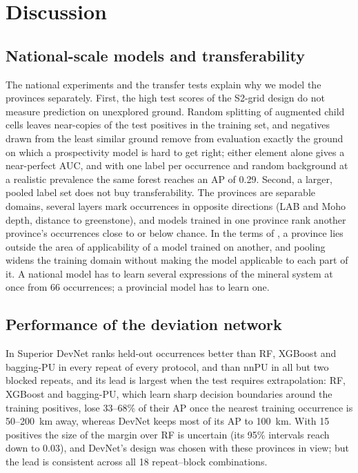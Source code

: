 \documentclass[pdflatex,sn-apa]{sn-jnl}
\begin{document}
\section{Discussion}\label{sec:discussion}

\subsection{National-scale models and transferability}\label{sec:disc-scale}

The national experiments and the transfer tests explain why we model the provinces separately. First, the high test scores of the S2-grid design do not measure prediction on unexplored ground. Random splitting of augmented child cells leaves near-copies of the test positives in the training set, and negatives drawn from the least similar ground remove from evaluation exactly the ground on which a prospectivity model is hard to get right; either element alone gives a near-perfect AUC, and with one label per occurrence and random background at a realistic prevalence the same forest reaches an AP of 0.29. Second, a larger, pooled label set does not buy transferability. The provinces are separable domains, several layers mark occurrences in opposite directions (LAB and Moho depth, distance to greenstone), and models trained in one province rank another province's occurrences close to or below chance. In the terms of \citet{Meyer2021}, a province lies outside the area of applicability of a model trained on another, and pooling widens the training domain without making the model applicable to each part of it. A national model has to learn several expressions of the mineral system at once from 66 occurrences; a provincial model has to learn one.

\subsection{Performance of the deviation network}\label{sec:disc-devnet}

In Superior DevNet ranks held-out occurrences better than RF, XGBoost and bagging-PU in every repeat of every protocol, and than nnPU in all but two blocked repeats, and its lead is largest when the test requires extrapolation: RF, XGBoost and bagging-PU, which learn sharp decision boundaries around the training positives, lose 33--68\% of their AP once the nearest training occurrence is 50--200~km away, whereas DevNet keeps most of its AP to 100~km. With 15 positives the size of the margin over RF is uncertain (its 95\% intervals reach down to 0.03), and DevNet's design was chosen with these provinces in view; but the lead is consistent across all 18 repeat--block combinations.
\end{document}
